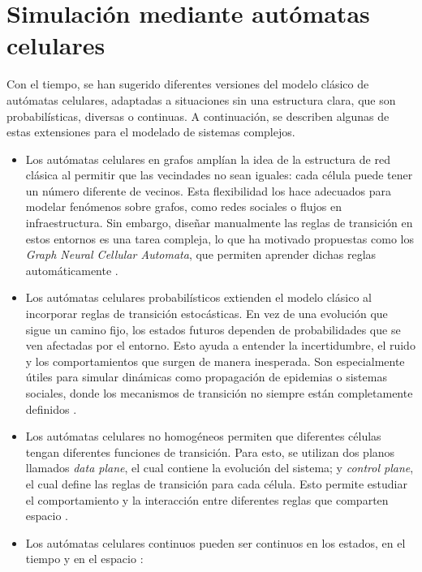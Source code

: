 \section{Simulación mediante autómatas celulares}

Con el tiempo, se han sugerido diferentes versiones del modelo clásico de autómatas celulares, adaptadas a situaciones sin una estructura clara, que son probabilísticas, diversas o continuas. A continuación, se describen algunas de estas extensiones para el modelado de sistemas complejos.

\begin{itemize}
	
	\item Los autómatas celulares en grafos amplían la idea de la estructura de red clásica al permitir que las vecindades no sean iguales: cada célula puede tener un número diferente de vecinos. Esta flexibilidad los hace adecuados para modelar fenómenos sobre grafos, como redes sociales o flujos en infraestructura. Sin embargo, diseñar manualmente las reglas de transición en estos entornos es una tarea compleja, lo que ha motivado propuestas como los \textit{Graph Neural Cellular Automata}, que permiten aprender dichas reglas automáticamente \cite{neuripsGCA}.
	
	
	
	\item Los autómatas celulares probabilísticos extienden el modelo clásico al incorporar reglas de transición estocásticas. En vez de una evolución que sigue un camino fijo, los estados futuros dependen de probabilidades que se ven afectadas por el entorno. Esto ayuda a entender la incertidumbre, el ruido y los comportamientos que surgen de manera inesperada. Son especialmente útiles para simular dinámicas como propagación de epidemias o sistemas sociales, donde los mecanismos de transición no siempre están completamente definidos \cite{gacsPCA}.
	
	\item Los autómatas celulares no homogéneos permiten que diferentes células tengan diferentes funciones de transición. Para esto, se utilizan dos planos llamados \textit{data plane}, el cual contiene la evolución del sistema; y \textit{control plane}, el cual define las reglas de transición para cada célula. Esto permite estudiar el comportamiento y la interacción entre diferentes reglas que comparten espacio \cite{hartmanIHCA}.
	
	
	
	\item Los autómatas celulares continuos pueden ser continuos en los estados, en el tiempo y en el espacio \cite{nks}:
	

\end{itemize}
